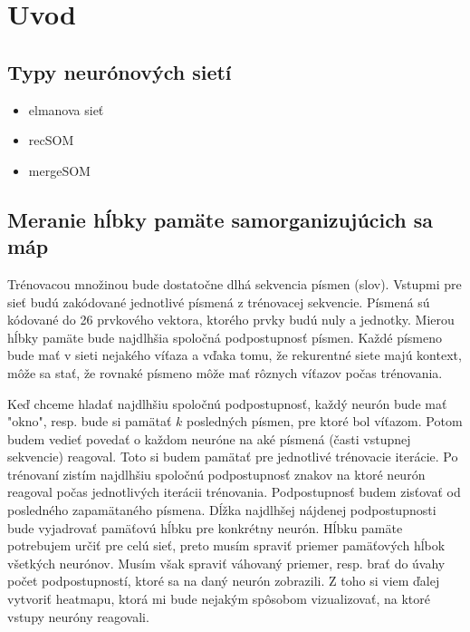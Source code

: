 \chapter{Uvod}


\section{Typy neurónových sietí}
\begin{itemize}
	\item elmanova sieť
	\item recSOM
	\item mergeSOM
\end{itemize}

\section{Meranie hĺbky pamäte samorganizujúcich sa máp}
Trénovacou množinou bude dostatočne dlhá sekvencia písmen (slov).
Vstupmi pre sieť budú zakódované jednotlivé písmená z trénovacej sekvencie.
Písmená sú kódované do 26 prvkového vektora, ktorého prvky budú nuly a jednotky.
Mierou hĺbky pamäte bude najdlhšia spoločná podpostupnosť písmen.
Každé písmeno bude mať v sieti nejakého víťaza a vďaka tomu, že rekurentné siete majú kontext, môže sa stať, že rovnaké písmeno môže mať rôznych víťazov počas trénovania.

Keď chceme hladať najdlhšiu spoločnú podpostupnosť, každý neurón bude mať "okno", resp. bude si pamätať $k$ posledných písmen, pre ktoré bol víťazom. Potom budem vedieť povedať o každom neuróne na aké písmená (časti vstupnej sekvencie) reagoval.
Toto si budem pamätať pre jednotlivé trénovacie iterácie. Po trénovaní zistím najdlhšiu spoločnú podpostupnosť znakov na ktoré neurón reagoval počas jednotlivých iterácii trénovania. Podpostupnosť budem zisťovať od posledného zapamätaného písmena. Dĺžka najdlhšej nájdenej podpostupnosti bude vyjadrovať pamäťovú hĺbku pre konkrétny neurón. Hĺbku pamäte potrebujem určiť pre celú sieť, preto musím spraviť priemer pamäťových hĺbok všetkých neurónov. Musím však spraviť váhovaný priemer, resp. brať do úvahy počet podpostupností, ktoré sa na daný neurón zobrazili.
Z toho si viem ďalej vytvoriť heatmapu, ktorá mi bude nejakým spôsobom vizualizovať, na ktoré vstupy neuróny reagovali.







